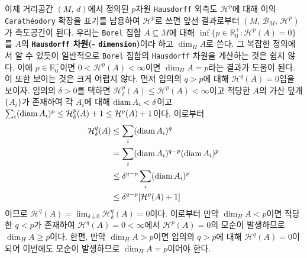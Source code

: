 \begin{enumerate}[label = \textsf{\textbf{\arabic*}}]
    이제 거리공간 $(M,\,d)$에서 정의된 $p$차원 \texttt{Hausdorff} 외측도 $\mathcal{H}^p$에 대해 이의 \texttt{Carath\'eodory} 확장을 표기를 남용하여 $\mathcal{H}^p$로 쓰면 앞선 결과로부터 $(M,\,\mathcal{B}_M,\,\mathcal{H}^p)$가 측도공간이 된다. 우리는 \texttt{Borel} 집합 $A\subseteq M$에 대해 $\inf\{p\in\mathbb{R}_0^+:\mathcal{H}^p(A)=0\}$를 $A$의 \textbf{\texttt{Hausdorff} 차원(- \texttt{dimension})}이라 하고 $\dim_HA$로 쓴다. 그 복잡한 정의에서 알 수 있듯이 일반적으로 \texttt{Borel} 집합의 \texttt{Hausdorff} 차원을 계산하는 것은 쉽지 않다. 이에 $p\in\mathbb{R}^+_0$이면 $0<\mathcal{H}^p(A)<\infty$이면 $\dim_HA=p$라는 결과가 도움이 된다. 이 또한 보이는 것은 크게 어렵지 않다. 먼저 임의의 $q>p$에 대해 $\mathcal{H}^q(A)=0$임을 보이자. 임의의 $\delta>0$를 택하면 $\mathcal{H}_\delta^p(A)\leq\mathcal{H}^p(A)<\infty$이고 적당한 $A$의 가산 덮개 $\{A_i\}$가 존재하여 각 $A_i$에 대해 $\mathrm{diam}\, A_i<\delta$이고 $\sum_i(\mathrm{diam}\, A_i)^p\leq\mathcal{H}_\delta^p(A)+1\leq\mathcal{H}^p(A)+1$이다. 이로부터
    \begin{align*}
        \mathcal{H}_\delta^q(A)&\leq\sum_i(\mathrm{diam}\, A_i)^q\\
        &=\sum_i(\mathrm{diam}\, A_i)^{q-p}(\mathrm{diam}\, A_i)^p\\
        &\leq\delta^{q-p}\sum_i(\mathrm{diam}\, A_i)^p\\
        &\leq\delta^{q-p}[\mathcal{H}^p(A)+1]
    \end{align*}
    이므로 $\mathcal{H}^q(A)=\lim_{\delta\downarrow0}\mathcal{H}_\delta^q(A)=0$이다. 이로부터 만약 $\dim_HA<p$이면 적당한 $q<p$가 존재하여 $\mathcal{H}^q(A)=0<\infty$에서 $\mathcal{H}^p(A)=0$의 모순이 발생하므로 $\dim_HA\geq p$이다. 한편, 만약 $\dim_HA>p$이면 임의의 $q>p$에 대해 $\mathcal{H}^q(A)=0$이 되어 이번에도 모순이 발생하므로 $\dim_HA=p$이어야 한다.
    

\end{enumerate}
